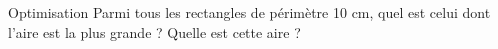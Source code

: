 \documentclass{beamer}
\begin{document}
\begin{frame}{Optimisation}
Parmi tous les rectangles de périmètre 10 cm, quel est celui dont l'aire est la plus grande ? Quelle est cette aire ?
\end{frame}
\end{document}
